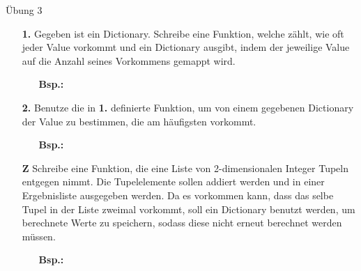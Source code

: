 \begin{frame}{Übung 3}
	\begin{itemize}
		\item[\textbf{1.}]Gegeben ist ein Dictionary. Schreibe eine Funktion, welche zählt, wie oft jeder Value vorkommt und ein Dictionary ausgibt, indem der jeweilige Value auf die Anzahl seines Vorkommens gemappt wird.
		\begin{itemize}
			\item[\textbf{Bsp.:}]
		\end{itemize}
		\item[\textbf{2.}] Benutze die in \textbf{1.} definierte Funktion, um von einem gegebenen Dictionary der Value zu bestimmen, die am häufigsten vorkommt.
		\begin{itemize}
			\item[\textbf{Bsp.:}]
		\end{itemize}
	
		\pause
		\item[\textbf{Z}] Schreibe eine Funktion, die eine Liste von 2-dimensionalen Integer Tupeln entgegen nimmt. Die Tupelelemente sollen addiert werden und in einer Ergebnisliste ausgegeben werden. Da es vorkommen kann, dass das selbe Tupel in der Liste zweimal vorkommt, soll ein Dictionary benutzt werden, um berechnete Werte zu speichern, sodass diese nicht erneut berechnet werden müssen.
		\begin{itemize}
			\item[\textbf{Bsp.:}]
		\end{itemize}
	\end{itemize}
\end{frame}



